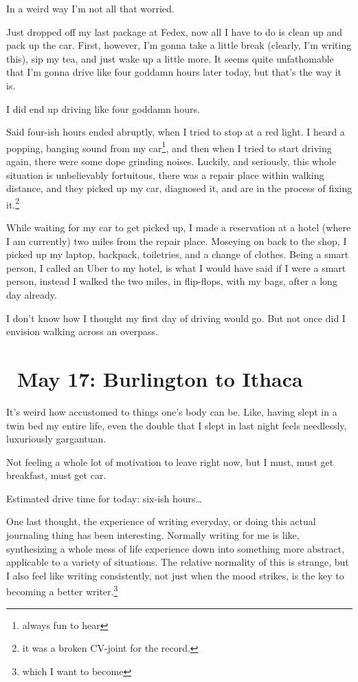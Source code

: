 \documentclass[../butidigress.tex]{subfiles}
\begin{document}
In a weird way I'm not all that worried.

\entryskip

Just dropped off my last package at Fedex, now all I have to do is clean up and pack up the car.
First, however, I'm gonna take a little break (clearly, I'm writing this), sip my tea, and just wake up a little more.
It seems quite unfathomable that I'm gonna drive like four goddamn hours later today, but that's the way it is.

\entryskip

I did end up driving like four goddamn hours.

Said four-ish hours ended abruptly, when I tried to stop at a red light.
I heard a popping, banging sound from my car\footnote{always fun to hear}, and then when I tried to start driving again, there were some dope grinding noises.
Luckily, and seriously, this whole situation is unbelievably fortuitous, there was a repair place within walking distance, and they picked up my car, diagnosed it, and are in the process of fixing it.\footnote{it was a broken CV-joint for the record.}

While waiting for my car to get picked up, I made a reservation at a hotel (where I am currently) two miles from the repair place.
Moseying on back to the shop, I picked up my laptop, backpack, toiletries, and a change of clothes.
Being a smart person, I called an Uber to my hotel, is what I would have said if I were a smart person, instead I walked the two miles, in flip-flops, with my bags, after a long day already.

I don't know how I thought my first day of driving would go.
But not once did I envision walking across an overpass.

\section{\ May 17: Burlington to Ithaca}
It's weird how accustomed to things one's body can be.
Like, having slept in a twin bed my entire life, even the double that I slept in last night feels needlessly, luxuriously gargantuan.

Not feeling a whole lot of motivation to leave right now, but I must, must get breakfast, must get car.

Estimated drive time for today: six-ish hours\ldots

One last thought, the experience of writing everyday, or doing this actual journaling thing has been interesting.
Normally writing for me is like, synthesizing a whole mess of life experience down into something more abstract, applicable to a variety of situations.
The relative normality of this is strange, but I also feel like writing consistently, not just when the mood strikes, is the key to becoming a better writer.\footnote{which I want to become}
\end{document}
